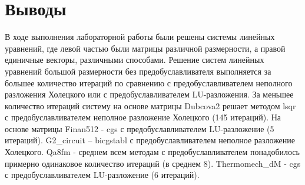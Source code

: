\section*{Выводы}

В ходе выполнения лабораторной работы были решены системы линейных уравнений,
где левой частью были матрицы различной размерности, а правой единичные векторы,
различными способами.
Решение систем линейных уравнений большой размерности без предобуславливателя выполняется
за большее количество итераций по сравнению с предобуславливателем неполного разложения
Холецкого или с предобуславливателем LU-разложения.
За меньшее количество итераций систему на основе матрицы Dubcova2 решает
методом lsqr с предобуславливателем неполное разложение Холецкого (145 итераций).
На основе матрицы Finan512 - cgs с предобуславливателем LU-разложение (5 итераций).
G2\_circuit – bicgstabl с предобуславливателем неполное разложение Холецкого.
Qa8fm - среднем всем методам с предобуславливателем понадобилось
примерно одинаковое количество итераций (в среднем 8).
Thermomech\_dM - cgs с предобуславливателем LU-разложение (6 итераций).
